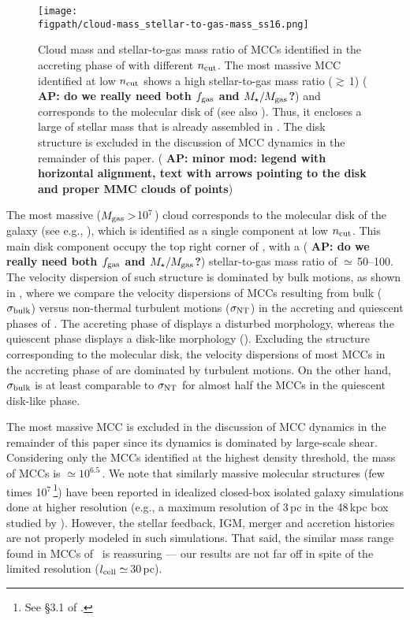 \IfFileExists{emulateapjlegacy.cls}{\documentclass[iop]{emulateapjlegacy}}{\documentclass[iop]{emulateapj}}
\newcommand{\AP}[1]{({\bf \color{apcolor} AP: #1})}
\def\figpath{./Fig}
\begin{document}
\begin{figure}
\centering
\texttt{[image: \\figpath/cloud-mass\_stellar-to-gas-mass\_ss16.png]}
\caption{Cloud mass and stellar-to-gas mass ratio of MCCs identified in the accreting phase of \flower with different $n_{\rm cut}$. The most massive MCC identified at low $n_{\rm cut}$ shows a high stellar-to-gas mass ratio ($\gtrsim$\,1) \AP{do we really need both $f_{\rm gas}$ and $M_\star/M_{\rm gas}$?} and corresponds to the molecular disk of \flower (see also ).
%
Thus, it encloses a large of stellar mass that is already assembled in \flower. The disk structure is excluded in the discussion of MCC dynamics in the remainder of this paper. \AP{minor mod: legend with horizontal alignment, text with arrows pointing to the disk and proper MMC clouds of points}
\label{fig:stellarRatio16}}
\end{figure}

The most massive ($M_{\rm gas}>$10$^7$\,\Msun) cloud corresponds to the molecular disk of the galaxy (see e.g., ), 
which is identified as a single component at low $n_{\rm cut}$. This main disk component occupy the top right corner of , with a \AP{do we really need both $f_{\rm gas}$ and $M_\star/M_{\rm gas}$?} 
stellar-to-gas mass ratio of $\simeq$\,50--100. 
The velocity dispersion of such structure is dominated by bulk motions, as shown in , where we compare 
the velocity dispersions of MCCs resulting from bulk ($\sigma_{\rm bulk}$) versus non-thermal turbulent motions ($\sigma_{\rm NT}$) 
in the accreting and quiescent phases of \flower.
The accreting phase of \flower displays a disturbed morphology, whereas the 
quiescent phase displays a disk-like morphology ().
Excluding the structure corresponding to the molecular disk, the 
velocity dispersions of most MCCs in the accreting phase of \flower are dominated by turbulent motions.
On the other hand, $\sigma_{\rm bulk}$ is at least comparable to $\sigma_{\rm NT}$ for almost half the MCCs
in the quiescent disk-like phase.

The most massive MCC is excluded in the discussion of MCC dynamics in the remainder of this paper
since its dynamics is dominated by large-scale shear.
Considering only the MCCs identified at the highest density threshold, the mass of MCCs is $\simeq10^{6.5}$\,\Msun.
We note that similarly massive molecular structures (few times 10$^7$\,\Msun\footnote{See \S{3.1} of \citet{Behrendt16a}.}) 
have been reported in idealized closed-box isolated galaxy simulations done at higher resolution (e.g., a maximum resolution of 3\,pc in the 48\,kpc box studied by \citealt{Behrendt16a}). However, the stellar feedback, IGM, merger and accretion histories are not properly modeled in such simulations. That said, the similar mass range found in MCCs of \flower\ is reassuring --- our results are not far off in spite of the limited resolution ($l_{\rm cell}\simeq$\,30\,pc).
\end{document}
